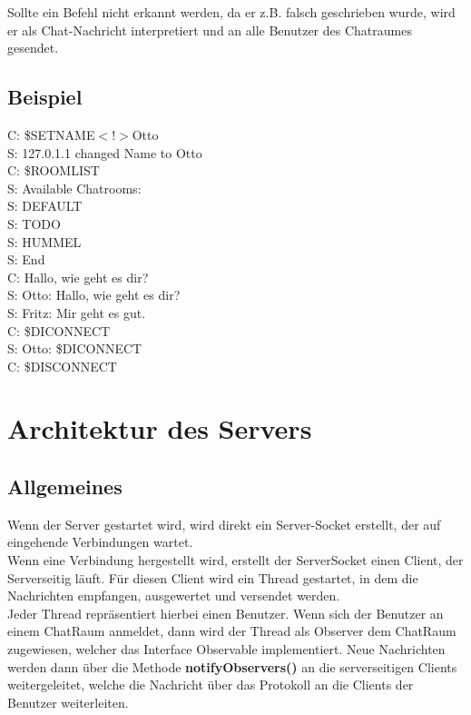 \documentclass[a4paper, oneside]{scrreprt}
\begin{document}
Sollte ein Befehl nicht erkannt werden, da er z.B. falsch geschrieben wurde, wird er als Chat-Nachricht interpretiert und an alle Benutzer des Chatraumes gesendet.

\section{Beispiel}
C: \$SETNAME$<$!$>$Otto\\
S: 127.0.1.1 changed Name to Otto\\
C: \$ROOMLIST\\
S: Available Chatrooms:\\
S: DEFAULT\\
S: TODO\\
S: HUMMEL\\
S: End\\
C: Hallo, wie geht es dir?\\
S: Otto: Hallo, wie geht es dir?\\
S: Fritz: Mir geht es gut.\\
C: \$DICONNECT\\
S: Otto: \$DICONNECT\\ 
C: \$DISCONNECT\\
\newpage


\chapter{Architektur des Servers}

\section{Allgemeines}

Wenn der Server gestartet wird, wird direkt ein Server-Socket erstellt, der auf eingehende Verbindungen wartet. \\
Wenn eine Verbindung hergestellt wird, erstellt der ServerSocket einen Client, der Serverseitig läuft. Für diesen Client wird ein Thread gestartet, in dem die Nachrichten empfangen, ausgewertet und versendet werden. \\
Jeder Thread repräsentiert hierbei einen Benutzer. Wenn sich der Benutzer an einem ChatRaum anmeldet, dann wird der Thread als Observer dem ChatRaum zugewiesen, welcher das Interface Observable implementiert. Neue Nachrichten werden dann über die Methode \textbf{notifyObservers()} an die serverseitigen Clients weitergeleitet, welche die Nachricht über das Protokoll an die Clients der Benutzer weiterleiten.\\
\end{document}
